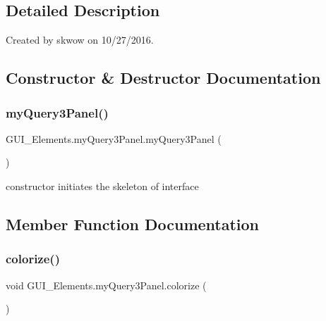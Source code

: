 \subsection{Detailed Description}
Created by skwow on 10/27/2016. 

\subsection{Constructor \& Destructor Documentation}
\hypertarget{class_g_u_i___elements_1_1my_query3_panel_a6d672bacf210e53a00e148a27a4ea2b8}{}\label{class_g_u_i___elements_1_1my_query3_panel_a6d672bacf210e53a00e148a27a4ea2b8} 
\subsubsection{\texorpdfstring{my\+Query3\+Panel()}{myQuery3Panel()}}
{\footnotesize\ttfamily G\+U\+I\+\_\+\+Elements.\+my\+Query3\+Panel.\+my\+Query3\+Panel (\begin{DoxyParamCaption}{ }\end{DoxyParamCaption})}



constructor initiates the skeleton of interface 



\subsection{Member Function Documentation}
\hypertarget{class_g_u_i___elements_1_1my_query3_panel_ad3c37661350b9ed95d749ca33450ff69}{}\label{class_g_u_i___elements_1_1my_query3_panel_ad3c37661350b9ed95d749ca33450ff69} 
\subsubsection{\texorpdfstring{colorize()}{colorize()}}
{\footnotesize\ttfamily void G\+U\+I\+\_\+\+Elements.\+my\+Query3\+Panel.\+colorize (\begin{DoxyParamCaption}{ }\end{DoxyParamCaption})}

